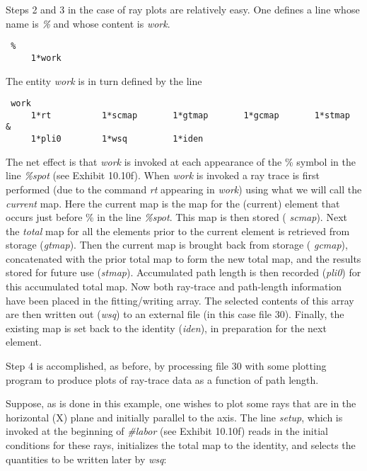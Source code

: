Steps 2 and 3 in the case of ray plots are relatively easy.  One defines a line whose
name is {\em \%} and whose content is {\em work}.

\begin{footnotesize}
\begin{verbatim}
 %
     1*work
\end{verbatim}
\end{footnotesize}
The entity {\em work} is in turn defined by the line

\begin{footnotesize}
\begin{verbatim}
 work
     1*rt          1*scmap       1*gtmap       1*gcmap       1*stmap    &
     1*pli0        1*wsq         1*iden
\end{verbatim}
\end{footnotesize}
The net effect is that {\em work} is invoked at each appearance of the \% symbol
in the line {\em \%spot} (see Exhibit 10.10f).  When {\em work} is
invoked a ray trace is first performed (due to the command {\em rt}
appearing in {\em work}) using what we will call the {\em current} map.
Here the current map is the map for the (current) element that occurs just
before \% in the line {\em \%spot}.  This map is then stored ({\em
scmap}).  Next the {\em total} map for all the elements prior to the
current element is retrieved from storage ({\em gtmap}).  Then the
current map is brought back from storage ({\em
gcmap}), concatenated with the prior total map to form the new total map,
and the results stored for future use ({\em stmap}).  Accumulated path
length is then recorded ({\em pli0}) for this accumulated total map.  Now
both ray-trace and path-length information have been placed in the
fitting/writing array.  The selected contents of this array are then
written out ({\em wsq}) to an external file (in this case file 30).
Finally, the existing map is set back to the identity ({\em iden}), in
preparation for the next element.

Step 4 is accomplished, as before, by processing file 30 with some
plotting program to produce plots of ray-trace data as a function of path
length.

Suppose, as is done in this example, one wishes to plot some rays that
are in the horizontal (X) plane and initially parallel to the axis.  The
line {\em setup}, which is invoked at the beginning of {\em \#labor} (see
Exhibit 10.10f) reads in the initial conditions for these rays,
initializes the total map to the identity, and
selects the quantities to be written later by {\em wsq}:

